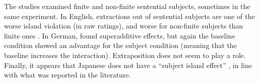 The studies examined finite and non-finite sentential subjects, sometimes in the same experiment. In English, extractions out of sentential subjects are one of the worse island violation (in raw ratings), and worse for non-finite subjects than finite ones \citep{Sprouse.2007.PhD}. In German, \citet{Jurka.2010} found superadditive effects, but again the baseline condition showed an advantage for the subject condition (meaning that the baseline increases the interaction). Extraposition does not seem to play a role. Finally, it appears that Japanese does not have a ``subject island effect'' \citep{Jurka.2010,Jurka.2011,Fukuda.2014}, in line with what was reported in the literature.

{\tiny}

{\tiny}
